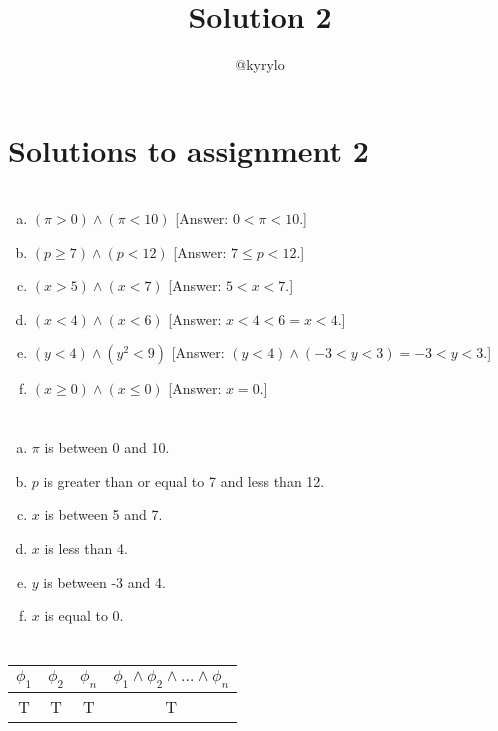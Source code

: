 \documentclass{article}
\title{Solution 2}
\author{@kyrylo}
\begin{document}
\section*{Solutions to assignment 2}

\section{}

\begin{enumerate}[(a)]
\item $(\pi > 0) \wedge (\pi < 10)$ [Answer: $0 < \pi < 10$.]
\item $(p \geq 7) \wedge (p < 12)$ [Answer: $7 \leq p < 12$.]
\item $(x > 5) \wedge (x < 7)$ [Answer: $5 < x < 7$.]
\item $(x < 4) \wedge (x < 6)$ [Answer: $x < 4 < 6 = x < 4$.]
\item $(y < 4) \wedge (y^2 < 9)$ [Answer: $(y < 4) \wedge (-3 < y < 3) = -3 < y < 3$.]
\item $(x \geq 0) \wedge (x \leq 0)$ [Answer: $x = 0$.]
\end{enumerate}

\section{}

\begin{enumerate}[(a)]
\item $\pi$ is between 0 and 10.
\item $p$ is greater than or equal to 7 and less than 12.
\item $x$ is between 5 and 7.
\item $x$ is less than 4.
\item $y$ is between -3 and 4.
\item $x$ is equal to 0.
\end{enumerate}

\section{}

\begin{tabular}{ | c | c | c | c | }
  \hline
  $\phi_1$ & $\phi_2$ & $\phi_n$ & $\phi_1 \wedge \phi_2 \wedge \dots \wedge \phi_n$ \\
  \hline
  T & T & T & T \\
  \hline
\end{tabular}
\end{document}
